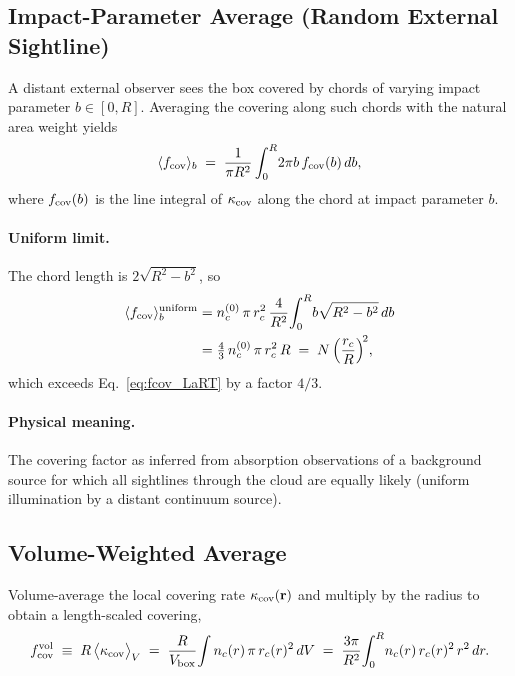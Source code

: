 \documentclass[english,a4paper]{my_memo}
\begin{document}
\subsection{Impact-Parameter Average (Random External Sightline)}
\label{sec:impact}

A distant external observer sees the box covered by chords of varying
impact parameter $b\in[0,R]$.  Averaging the covering along such chords
with the natural area weight yields
\begin{equation}
   \langle f_{\rm cov}\rangle_{b}
   \;=\; \frac{1}{\pi R^{2}}
         \int_{0}^{R}\! 2\pi b\,f_{\rm cov}(b)\,db,
   \label{eq:fcov_impact}
\end{equation}
where $f_{\rm cov}(b)$ is the line integral of $\kappa_{\rm cov}$ along the
chord at impact parameter $b$.

\paragraph{Uniform limit.} The chord length is $2\sqrt{R^{2}-b^{2}}$, so
\begin{align}
   \langle f_{\rm cov}\rangle_{b}^{\rm uniform}
   &= n_c^{(0)}\,\pi\,r_c^{2}\,
      \frac{4}{R^{2}}\!\int_{0}^{R}\!b\sqrt{R^{2}-b^{2}}\,db \nonumber \\
   &= \tfrac{4}{3}\,n_c^{(0)}\,\pi\,r_c^{2}\,R
   \;=\; N\,\Bigl(\frac{r_c}{R}\Bigr)^{\!2},
   \label{eq:fcov_impact_uniform}
\end{align}
which exceeds Eq.~\eqref{eq:fcov_LaRT} by a factor $4/3$.

\paragraph{Physical meaning.} The covering factor as inferred from
absorption observations of a background source for which all sightlines
through the cloud are equally likely (uniform illumination by a
distant continuum source).

\subsection{Volume-Weighted Average}
\label{sec:volume}

Volume-average the local covering rate $\kappa_{\rm cov}(\mathbf{r})$ and
multiply by the radius to obtain a length-scaled covering,
\begin{equation}
   f_{\rm cov}^{\rm vol}
   \;\equiv\; R\,\bigl\langle\kappa_{\rm cov}\bigr\rangle_{V}
   \;=\; \frac{R}{V_{\rm box}}\!\int n_c(r)\,\pi\,r_c(r)^{2}\,dV
   \;=\; \frac{3\pi}{R^{2}}\!\int_{0}^{R}\!n_c(r)\,r_c(r)^{2}\,r^{2}\,dr.
   \label{eq:fcov_volume}
\end{equation}
\end{document}
